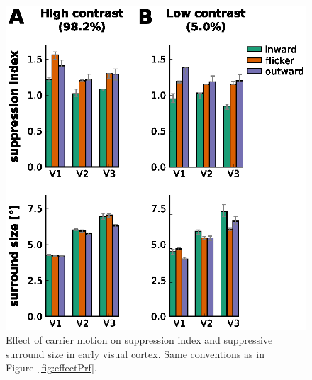 \begin{figure}[htbp!]
\centering
\includegraphics[width=\textwidth]{figures/chapter_04/fig2c.eps}
\caption{Effect of carrier motion on suppression index and suppressive surround size in early visual cortex. Same conventions as in Figure~\ref{fig:effectPrf}.}
\label{fig:effectPrf_si} 
\end{figure}


